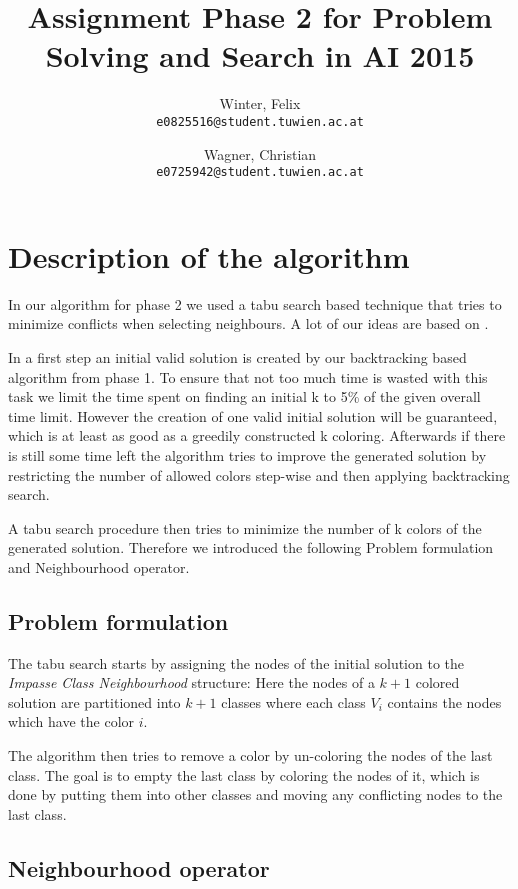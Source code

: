 \documentclass[a4paper]{scrartcl}
\author{
  Winter, Felix\\
  \texttt{e0825516@student.tuwien.ac.at}
  \and
  Wagner, Christian\\
  \texttt{e0725942@student.tuwien.ac.at}
}
\title{Assignment Phase 2 for Problem Solving and Search in AI 2015}
\begin{document}
\setlength{\abovedisplayskip}{0pt}
\setlength{\belowdisplayskip}{0pt}

\begingroup
 \makeatletter
 \maketitle
\endgroup

\section{Description of the algorithm}

In our algorithm for phase 2 we used a tabu search based technique that tries to minimize conflicts when selecting neighbours. A lot of our ideas are based on \cite{malagutitabu}.

In a first step an initial valid solution is created by our backtracking based algorithm from phase 1. 
To ensure that not too much time is wasted with this task we limit the time spent on finding an initial k to 5\% of the given overall time limit.
However the creation of one valid initial solution will be guaranteed, which is at least as good as a greedily constructed k coloring.
Afterwards if there is still some time left the algorithm tries to improve the generated solution by restricting the number of allowed colors step-wise and then applying backtracking search.


A tabu search procedure then tries to minimize the number of k colors of the generated solution. Therefore we introduced the following Problem formulation and Neighbourhood operator.

\subsection{Problem formulation}

The tabu search starts by assigning the nodes of the initial solution to the \textit{Impasse Class Neighbourhood}\cite{malagutitabu} structure:
Here the nodes of a $k+1$ colored solution are partitioned into $k+1$ classes where each class $V_i$ contains the nodes which have the color $i$.

The algorithm then tries to remove a color by un-coloring the nodes of the last class. The goal is to empty the last class by coloring the nodes of it, which is done by putting them into other classes and moving any conflicting nodes to the last class. 
\subsection{Neighbourhood operator}
\end{document}
